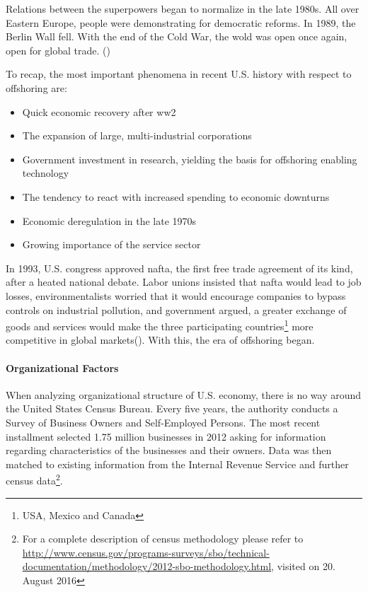 Relations between the superpowers began to normalize in the late 1980s. All over Eastern Europe, people were demonstrating for democratic reforms. In 1989, the Berlin Wall fell. With the end of the Cold War, the wold was open once again, open for global trade.
(\cite{Winkler.1994c})

To recap, the most important phenomena in recent U.S. history with respect to offshoring are:
\begin{itemize}
	\item Quick economic recovery after \gls{ww2}
	\item The expansion of large, multi-industrial corporations
	\item Government investment in research, yielding the basis for offshoring enabling technology
	\item The tendency to react with increased spending to economic downturns
	\item Economic deregulation in the late 1970s
	\item Growing importance of the service sector
	\end{itemize}
In 1993, U.S. congress approved \acrlong{nafta}, the first free trade agreement of its kind, after a heated national debate. Labor unions insisted that \acrshort{nafta} would lead to job losses, environmentalists worried that it would encourage companies to bypass controls on industrial pollution, and government argued, a greater exchange of goods and services would make the three participating countries\footnote{USA, Mexico and Canada} more competitive in global markets(\cite{Winkler.1994c}). With this, the era of offshoring began.

\paragraph{Organizational Factors}
When analyzing organizational structure of U.S. economy, there is no way around the United States Census Bureau. Every five years, the authority conducts a Survey of Business Owners and Self-Employed Persons. The most recent installment selected 1.75 million businesses in 2012 asking for information regarding characteristics of the businesses and their owners. Data was then matched to existing information from the Internal Revenue Service and further census data\footnote{For a complete description of census methodology please refer to \url{http://www.census.gov/programs-surveys/sbo/technical-documentation/methodology/2012-sbo-methodology.html}, visited on 20. August 2016}.

